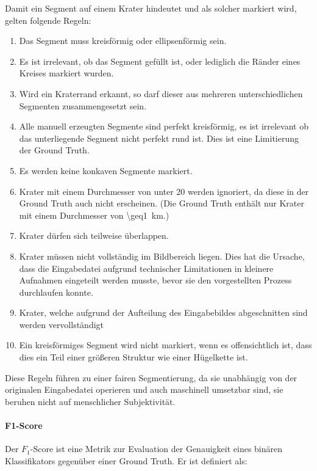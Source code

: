 Damit ein Segment auf einem Krater hindeutet und als solcher markiert wird, gelten folgende Regeln:

\begin{enumerate}
	\item Das Segment muss kreisförmig oder ellipsenförmig sein.
	\item Es ist irrelevant, ob das Segment gefüllt ist, oder lediglich die Ränder eines Kreises markiert wurden.
	\item Wird ein Kraterrand erkannt, so darf dieser aus mehreren unterschiedlichen Segmenten zusammengesetzt sein.
	\item Alle manuell erzeugten Segmente sind perfekt kreisförmig, es ist irrelevant ob das unterliegende Segment nicht perfekt rund ist. Dies ist eine Limitierung der Ground Truth.
	\item Es werden keine konkaven Segmente markiert.
	\item Krater mit einem Durchmesser von unter \SI{20}{\pixel} werden ignoriert, da diese in der Ground Truth auch nicht erscheinen. (Die Ground Truth enthält nur Krater mit einem Durchmesser von \SI{\geq1}{\kilo\meter}.)
	\item Krater dürfen sich teilweise überlappen.
	\item Krater müssen nicht vollständig im Bildbereich liegen. Dies hat die Ursache, dass die Eingabedatei aufgrund technischer Limitationen in kleinere Aufnahmen eingeteilt werden musste, bevor sie den vorgestellten Prozess durchlaufen konnte.
	\item Krater, welche aufgrund der Aufteilung des Eingabebildes abgeschnitten sind werden vervollständigt
	\item Ein kreisförmiges Segment wird nicht markiert, wenn es offensichtlich ist, dass dies ein Teil einer größeren Struktur wie einer Hügelkette ist.
\end{enumerate}

Diese Regeln führen zu einer fairen Segmentierung, da sie unabhängig von der originalen Eingabedatei operieren und auch maschinell umsetzbar sind, \dahe sie beruhen nicht auf menschlicher Subjektivität.

\paragraph{F1-Score}

Der $F_1$-Score ist eine Metrik zur Evaluation der Genauigkeit eines binären Klassifikators gegenüber einer Ground Truth. Er ist definiert als: \cite{chinchor_92}

